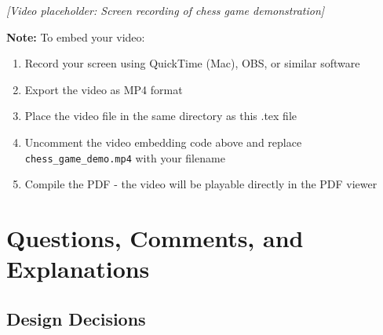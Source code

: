 \documentclass[12pt]{article}
\begin{document}


\textit{[Video placeholder: Screen recording of chess game demonstration]}

\textbf{Note:} To embed your video:
\begin{enumerate}
    \item Record your screen using QuickTime (Mac), OBS, or similar software
    \item Export the video as MP4 format
    \item Place the video file in the same directory as this .tex file
    \item Uncomment the video embedding code above and replace \texttt{chess\_game\_demo.mp4} with your filename
    \item Compile the PDF - the video will be playable directly in the PDF viewer
\end{enumerate}

\section{Questions, Comments, and Explanations}

\subsection{Design Decisions}
\end{document}
